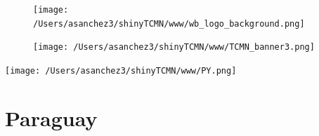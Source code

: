 \documentclass{article}\usepackage[]{graphicx}\usepackage[]{color}
\begin{document}
%

\begin{figure}
  \vspace{-3ex} %
  \hspace{-7ex} %
  \texttt{[image: /Users/asanchez3/shinyTCMN/www/wb\_logo\_background.png]}
\end{figure}
\begin{figure}
  \begin{minipage}[t]{0.99\textwidth} %
      \vspace{-30ex}
      \hspace{-2ex}
      \raggedright{\texttt{[image: /Users/asanchez3/shinyTCMN/www/TCMN\_banner3.png]}}
  \end{minipage}
\end{figure}
%
\begin{minipage}[t]{0.99\textwidth} %
  \vspace{-1.5cm}
  \begin{minipage}[c]{0.36\textwidth} 
    \begin{minipage}[c]{0.28\textwidth} %
      \texttt{[image: /Users/asanchez3/shinyTCMN/www/PY.png]}
    \end{minipage}
    \begin{minipage}[c]{0.70\textwidth} %
      \section*{\color{blue!40!black}Paraguay}
    \end{minipage}
  \end{minipage}
  \begin{minipage}[c]{0.63\textwidth} %
    \centering
  \end{minipage}  
\end{minipage} %
\end{document}
